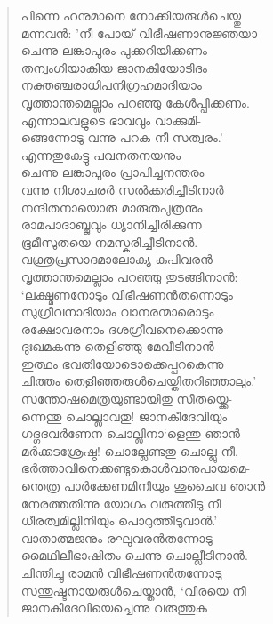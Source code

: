 \begin{verse}
പിന്നെ ഹനുമാനെ നോക്കിയരുള്‍ചെയ്തു\\
മന്നവന്‍: ’നീ പോയ് വിഭീഷണാനുജ്ഞയാ\\
ചെന്നു ലങ്കാപുരം പുക്കറിയിക്കണം\\
തന്വംഗിയാകിയ ജാനകിയോടിദം\\
നക്തഞ്ചരാധിപനിഗ്രഹമാദിയാം\\
വൃത്താന്തമെല്ലാം പറഞ്ഞു കേള്‍പ്പിക്കണം.\\
എന്നാലവളുടെ ഭാവവും വാക്കുമി-\\
ങ്ങെന്നോടു വന്നു പറക നീ സത്വരം.’\\
എന്നതുകേട്ടു പവനതനയനും\\
ചെന്നു ലങ്കാപുരം പ്രാപിച്ചനന്തരം\\
വന്നു നിശാചരര്‍ സല്‍ക്കരിച്ചീടിനാര്‍\\
നന്ദിതനായൊരു മാരുതപുത്രനും\\
രാമപാദാബ്ജവും ധ്യാനിച്ചിരിക്കുന്ന\\
ഭൂമീസുതയെ നമസ്കരിച്ചീടിനാന്‍.\\
വക്ത്രപ്രസാദമാലോക്യ കപിവരന്‍\\
വൃത്താന്തമെല്ലാം പറഞ്ഞു തുടങ്ങിനാന്‍:\\
‘ലക്ഷ്മണനോടും വിഭീഷണന്‍തന്നൊടും\\
സുഗ്രീവനാദിയാം വാനരന്മാരൊടും\\
രക്ഷോവരനാം ദശഗ്രീവനെക്കൊന്നു\\
ദുഃഖമകന്നു തെളിഞ്ഞു മേവീടിനാന്‍\\
ഇത്ഥം ഭവതിയോടൊക്കെപ്പറകെന്നു\\
ചിത്തം തെളിഞ്ഞരുള്‍ചെയ്തിതറിഞ്ഞാലും.’\\
സന്തോഷമെത്രയുണ്ടായിതു സീതയ്ക്കെ-\\
ന്നെന്തു ചൊല്ലാവതു! ജാനകീദേവിയും\\
ഗദ്ഗദവര്‍ണേന ചൊല്ലിനാ‘ളെന്തു ഞാന്‍\\
മര്‍ക്കടശ്രേഷ്ഠ! ചൊല്ലേണ്ടതു ചൊല്ലു നീ.\\
ഭര്‍ത്താവിനെക്കണ്ടുകൊള്‍വാനുപായമെ-\\
ന്തെത്ര പാര്‍ക്കേണമിനിയും ശുചൈവ ഞാന്‍\\
നേരത്തതിന്നു യോഗം വരുത്തീടു നീ\\
ധീരത്വമില്ലിനിയും പൊറുത്തീടുവാന്‍.’\\
വാതാത്മജനും രഘുവരന്‍തന്നോടു\\
മൈഥിലീഭാഷിതം ചെന്നു ചൊല്ലീടിനാന്‍.\\
ചിന്തിച്ചു രാമന്‍ വിഭീഷണന്‍തന്നോടു\\
സന്തുഷ്ടനായരുള്‍ചെയ്താന്‍, ‘വിരയെ നീ\\
ജാനകീദേവിയെച്ചെന്നു വരുത്തുക\\

\end{verse}
